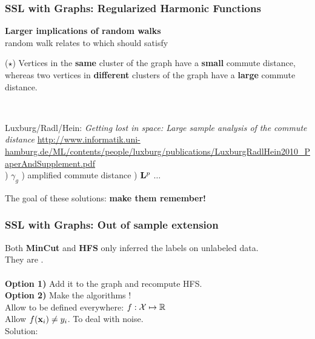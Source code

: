 \documentclass{beamer}
\begin{document}
\begin{frame}
\frametitle{SSL with Graphs: Regularized Harmonic Functions}

\textbf{Larger implications of random walks} \\[0.5em]

random walk relates to 
\pause 
which should satisfy \\[0.5em]

\begin{block}{}
($\star$) Vertices in the \textbf{same} cluster of the graph have a \textbf{small} commute
distance, whereas two vertices in \textbf{different} clusters of the graph have a \textbf{large}
commute distance.
\vspace{0.5em}
\end{block}
\pause 
{}
\pause 
{} \\[0.5em]
\pause 

{\small Luxburg/Radl/Hein: \textit{Getting \alert{lost} in space: Large sample analysis of the
commute distance}}
{\scriptsize 
\url{http://www.informatik.uni-hamburg.de/ML/contents/people/luxburg/publications/LuxburgRadlHein2010_PaperAndSupplement.pdf}
}
\\[0.5em]
\pause
{}
) $\gamma_g$
) amplified commute distance
) $\mathbf{L}^p$
\pause  $\dots$ \\[0.5em]
\pause

The goal of these solutions: \pause
\textbf{make them remember!}

\end{frame}

\begin{frame}
\frametitle{SSL with Graphs: Out of sample extension}

Both \textbf{MinCut} and \textbf{HFS} only inferred the labels
on unlabeled data. \\[1em]
They are \pause {}.
\\[1em] \pause
{}
\pause
{} \\[1em]
\pause
\textbf{Option 1)} Add it to the graph and recompute HFS. \\[1em]
\pause
\textbf{Option 2)} Make the algorithms ! \\[1em]
\pause
Allow to be defined everywhere: $f: \mathcal{X} \mapsto \mathbb{R}$ \\
\pause
Allow $f(\mathbf{x}_i) \ne y_i$. \pause {} \pause To deal with noise.\\[1em]
\pause
Solution: 
\end{frame}


\MakeLastSlide
\end{document}
